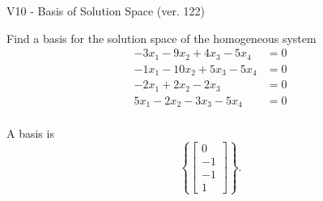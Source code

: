 \begin{exercise}
  \begin{exerciseTitle}V10 - Basis of Solution Space (ver. 122)\end{exerciseTitle}
  \begin{exerciseStatement}
    Find a basis for the solution space of the homogeneous system 
\begin{align*}
 -3 x_ 1 -9 x_ 2 + 4 x_ 3 -5 x_ 4 &= 0  \\ 
  -1 x_ 1 -10 x_ 2 + 5 x_ 3 -5 x_ 4 &= 0  \\ 
  -2 x_ 1 + 2 x_ 2 -2 x_ 3 &= 0  \\ 
  5 x_ 1 -2 x_ 2 -3 x_ 3 -5 x_ 4 &= 0  \\ 
 \end{align*}


 
  \end{exerciseStatement}

  \begin{exerciseAnswer}
   A basis is   
\[\left\{\left[\begin{array}{c}
0 \\
-1 \\
-1 \\
1
\end{array}\right]\right\}.\]

  


  \end{exerciseAnswer}
\end{exercise}